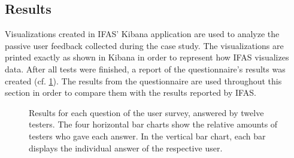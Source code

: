 \subsection{Results}

Visualizations created in \ac{IFAS}' Kibana application are used to analyze the passive user feedback collected during the case study.
The visualizations are printed exactly as shown in Kibana in order to represent how \ac{IFAS} visualizes data.
After all tests were finished, a report of the questionnaire's results was created (cf. \cref{figure:evaluation:user:survey-report}).
The results from the questionnaire are used throughout this section in order to compare them with the results reported by \ac{IFAS}.

\begin{figure}[t]
        \caption[Results for each question of the user survey.]{
        Results for each question of the user survey, answered by twelve testers.
        The four horizontal bar charts show the relative amounts of testers who gave each answer.
        In the vertical bar chart, each bar displays the individual answer of the respective user.
        }
        \label{figure:evaluation:user:survey-report}
\end{figure}

